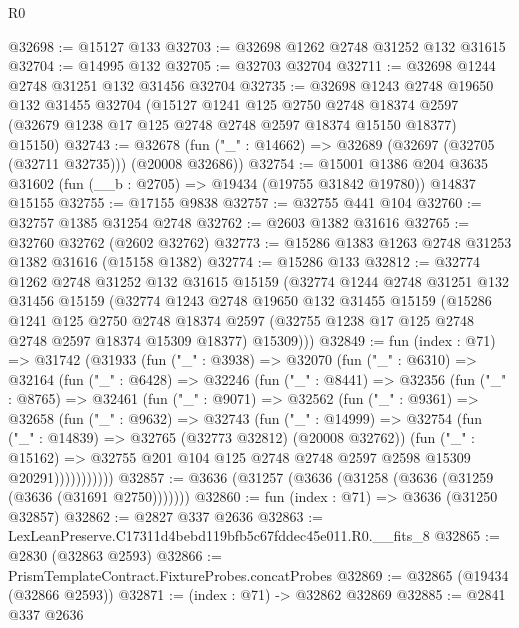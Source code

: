 \begin{lexlean}{R0}
\begin{coremodule}
@32698 := @15127 @133
@32703 := @32698 @1262 @2748 @31252 @132 @31615
@32704 := @14995 @132
@32705 := @32703 @32704
@32711 := @32698 @1244 @2748 @31251 @132 @31456 @32704
@32735 := @32698
    @1243
    @2748
    @19650
    @132
    @31455
    @32704
    (@15127
      @1241
      @125
      @2750
      @2748
      @18374
      @2597
      (@32679 @1238 @17 @125 @2748 @2748 @2597 @18374 @15150 @18377)
      @15150)
@32743 := @32678 (fun ("_" : @14662) => @32689 (@32697 (@32705 (@32711 @32735))) (@20008 @32686))
@32754 := @15001
    @1386
    @204
    @3635
    @31602
    (fun (__b : @2705) => @19434 (@19755 @31842 @19780))
    @14837
    @15155
@32755 := @17155 @9838
@32757 := @32755 @441 @104
@32760 := @32757 @1385 @31254 @2748
@32762 := @2603 @1382 @31616
@32765 := @32760 @32762 (@2602 @32762)
@32773 := @15286 @1383 @1263 @2748 @31253 @1382 @31616 (@15158 @1382)
@32774 := @15286 @133
@32812 := @32774
    @1262
    @2748
    @31252
    @132
    @31615
    @15159
    (@32774
      @1244
      @2748
      @31251
      @132
      @31456
      @15159
      (@32774
        @1243
        @2748
        @19650
        @132
        @31455
        @15159
        (@15286
          @1241
          @125
          @2750
          @2748
          @18374
          @2597
          (@32755 @1238 @17 @125 @2748 @2748 @2597 @18374 @15309 @18377)
          @15309)))
@32849 := fun (index : @71) =>
  @31742
    (@31933
      (fun ("_" : @3938) =>
      @32070
        (fun ("_" : @6310) =>
        @32164
          (fun ("_" : @6428) =>
          @32246
            (fun ("_" : @8441) =>
            @32356
              (fun ("_" : @8765) =>
              @32461
                (fun ("_" : @9071) =>
                @32562
                  (fun ("_" : @9361) =>
                  @32658
                    (fun ("_" : @9632) =>
                    @32743
                      (fun ("_" : @14999) =>
                      @32754
                        (fun ("_" : @14839) => @32765 (@32773 @32812) (@20008 @32762))
                        (fun ("_" : @15162) =>
                        @32755 @201 @104 @125 @2748 @2748 @2597 @2598 @15309 @20291)))))))))))
@32857 := @3636 (@31257 (@3636 (@31258 (@3636 (@31259 (@3636 (@31691 @2750)))))))
@32860 := fun (index : @71) => @3636 (@31250 @32857)
@32862 := @2827 @337 @2636
@32863 := LexLeanPreserve.C17311d4bebd119bfb5c67fddec45e011.R0.__fits_8
@32865 := @2830 (@32863 @2593)
@32866 := PrismTemplateContract.FixtureProbes.concatProbes
@32869 := @32865 (@19434 (@32866 @2593))
@32871 := (index : @71) -> @32862 @32869
@32885 := @2841
    @337
    @2636

\end{coremodule}
\end{lexlean}
